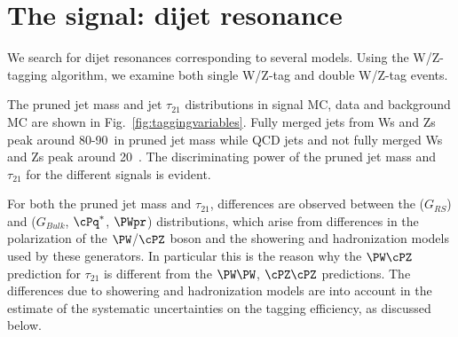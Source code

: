 \section{The signal: dijet resonance}
\label{sec:signal}

We search for dijet resonances corresponding to several models.
Using the W/Z-tagging algorithm, we examine both single W/Z-tag and double W/Z-tag events.

The pruned jet mass and jet $\tau_{21}$ distributions in signal MC, data and background MC are shown in Fig.~\ref{fig:taggingvariables}.
Fully merged jets from Ws and Zs peak around 80-90~\GeV in pruned jet mass while QCD jets and not fully merged Ws and Zs peak around 20~\GeV.
The discriminating power of the pruned jet mass and $\tau_{21}$ for the different signals is evident.

For both the pruned jet mass and $\tau_{21}$, differences are observed
between the \HERWIG{++} ($G_{RS}$) and 
($G_{Bulk}$, $\cPq^*$, $\PWpr$) distributions, which arise from
differences in the polarization of the $\PW$/$\cPZ$ boson and the
showering and hadronization models used by these generators. In
particular this is the reason why the $\PW\cPZ$ prediction for
$\tau_{21}$ is different from the $\PW\PW$, $\cPZ\cPZ$ predictions.
The differences due to showering and hadronization models
are into account in the estimate of the systematic uncertainties
on the tagging efficiency, as discussed below.

